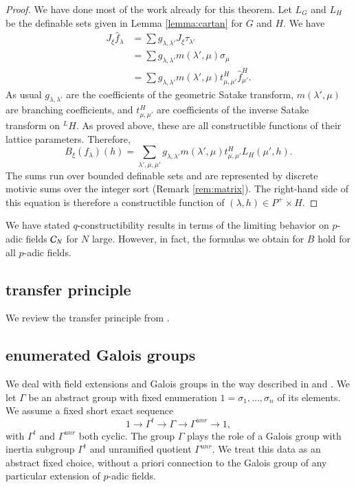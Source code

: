\begin{proof}
  We have done most of the work already for this theorem.  Let $L_G$
  and $L_H$ be the definable sets given in Lemma \ref{lemma:cartan}
  for $G$ and $H$.  
   We have
  \begin{align*}
    J_\xi \hat f_\lambda  &= 
\sum  g_{\lambda,\lambda'} J_\xi\tau_{\lambda'}
\\ &=
\sum g_{\lambda,\lambda'} m(\lambda',\mu) \sigma_\mu 
\\ &=
\sum g_{\lambda,\lambda'} m(\lambda',\mu) t^H_{\mu,\mu'} \hat f_{\mu'}^H.           
    \end{align*}
As usual $g_{\lambda,\lambda'}$ are the coefficients of the geometric
Satake
transform, $m(\lambda',\mu)$ are branching coefficients, and
$t^H_{\mu,\mu'}$ are coefficients of the inverse Satake transform on
${}^LH$.  As proved above, these are all constructible functions of
their
lattice parameters.
Therefore,
\[
B_\xi(f_\lambda)(h) =
\sum_{\lambda',\mu,\mu'} g_{\lambda,\lambda'} m(\lambda',\mu)
t^H_{\mu,\mu'}
L_H(\mu',h).
\]
The sums run over bounded definable sets and are represented by
discrete motivic sums over the integer sort (Remark \ref{rem:matrix}).  
The right-hand side of
this
equation is therefore a constructible function of $(\lambda,h)\in
P^+\times H$.
\end{proof}

\begin{remark}  
  We have stated $q$-constructibility results in terms of the limiting
  behavior on $p$-adic fields $\mathcal C_N$ for $N$ large.  However, in fact,
  the formulas we obtain for $B$ hold for all $p$-adic fields.
\end{remark}


\subsection{transfer principle}\label{sec:transfer}

We review the transfer principle from
\cite{cluckers2010constructible}.

\subsection{enumerated Galois groups}

We deal with field extensions and Galois groups in the way described
in \cite{gordon} and \cite{cluckers2011transfer}.  We let $\Gamma$ be
an abstract group with fixed enumeration $1=\sigma_1,\ldots,\sigma_n$
of its elements.  We assume a fixed short exact sequence
\[
1\to \Gamma^t\to\Gamma\to\Gamma^{unr}\to 1,
\]
with $\Gamma^t$ and $\Gamma^{unr}$ both cyclic.  The group $\Gamma$
plays the role of a Galois group with inertia subgroup $\Gamma^t$ and
unramified quotient $\Gamma^{unr}$.  We treat this data as an abstract
fixed choice, without a priori connection to the Galois group of any
particular extension of $p$-adic fields.

